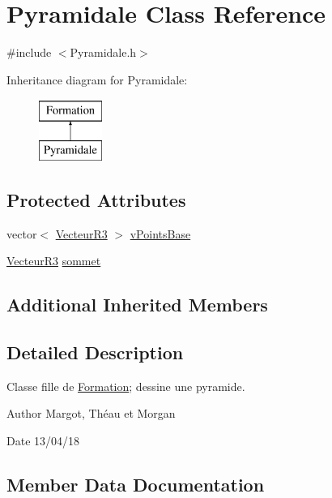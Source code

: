 \hypertarget{class_pyramidale}{}\section{Pyramidale Class Reference}
\label{class_pyramidale}


{\ttfamily \#include $<$Pyramidale.\+h$>$}

Inheritance diagram for Pyramidale\+:\begin{figure}[H]
\begin{center}
\leavevmode
\includegraphics[height=2.000000cm]{class_pyramidale}
\end{center}
\end{figure}
\subsection*{Protected Attributes}
\begin{DoxyCompactItemize}
\item 
vector$<$ \mbox{\hyperlink{class_vecteur_r3}{Vecteur\+R3}} $>$ \mbox{\hyperlink{class_pyramidale_a3c8f1d8480417e91a65daa4f6d55c0ed}{v\+Points\+Base}}
\item 
\mbox{\hyperlink{class_vecteur_r3}{Vecteur\+R3}} \mbox{\hyperlink{class_pyramidale_a90a296c3487819ec38b5b9f7bbc13c8b}{sommet}}
\end{DoxyCompactItemize}
\subsection*{Additional Inherited Members}


\subsection{Detailed Description}
Classe fille de \mbox{\hyperlink{class_formation}{Formation}}; dessine une pyramide. \begin{DoxyAuthor}{Author}
Margot, Théau et Morgan 
\end{DoxyAuthor}
\begin{DoxyDate}{Date}
13/04/18 
\end{DoxyDate}


\subsection{Member Data Documentation}
\mbox{\label{class_pyramidale_a90a296c3487819ec38b5b9f7bbc13c8b}} 
